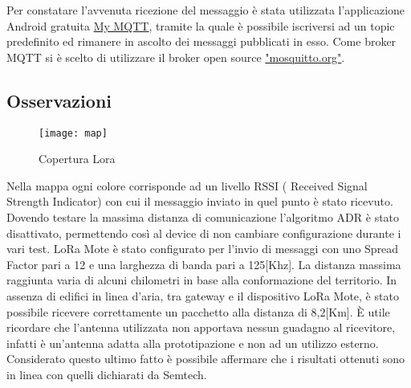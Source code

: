 Per constatare l'avvenuta ricezione del
messaggio è stata utilizzata l'applicazione Android gratuita \href{
https://play.google.com/store/apps/details?id=at.tripwire.mqtt.client&hl=en}{My
MQTT}, tramite la
quale è possibile iscriversi ad un topic predefinito ed rimanere in ascolto dei
messaggi pubblicati in esso. 
Come broker MQTT si è scelto di utilizzare il
broker open source \href{http://mosquitto.org/}{"mosquitto.org"}. 
\subsection{Osservazioni}

\begin{figure}[th]
        \centering 
                \texttt{[image: map]}
        \caption{Copertura Lora}
        \label{fig:map}
\end{figure}
Nella mappa ogni colore corrisponde ad un livello  RSSI ( Received Signal
Strength Indicator) con cui il  messaggio inviato in quel punto è stato
ricevuto.  Dovendo testare la massima distanza di comunicazione l'algoritmo ADR
è stato disattivato, permettendo così al device di non cambiare configurazione
durante i vari test.  LoRa Mote è stato configurato per l'invio di messaggi con
uno Spread Factor pari a 12 e una larghezza di banda pari a 125[Khz]. 
La distanza massima raggiunta varia di alcuni chilometri in base
alla conformazione del territorio. In assenza di edifici in linea d'aria, tra
gateway e il dispositivo LoRa Mote, è stato possibile ricevere correttamente un
pacchetto alla distanza di 8,2[Km].  È utile ricordare che l'antenna utilizzata non apportava nessun guadagno al
ricevitore, infatti è un'antenna adatta alla prototipazione e non ad un
utilizzo esterno.
Considerato questo ultimo fatto è possibile affermare che i risultati ottenuti sono in
linea con quelli dichiarati da Semtech.
